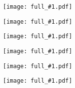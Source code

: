 \documentclass[landscape,a4paper]{article}
\newcommand{\image}[1]{
\begin{figure}%
\texttt{[image: full\_\#1.pdf]}
\end{figure}%
}
\begin{document}
\image{000_title}
\image{010_hardware}
\image{020_device}
\image{030_device_cfg}
\image{040_graphene}
\image{060_devrole}

\end{document}

